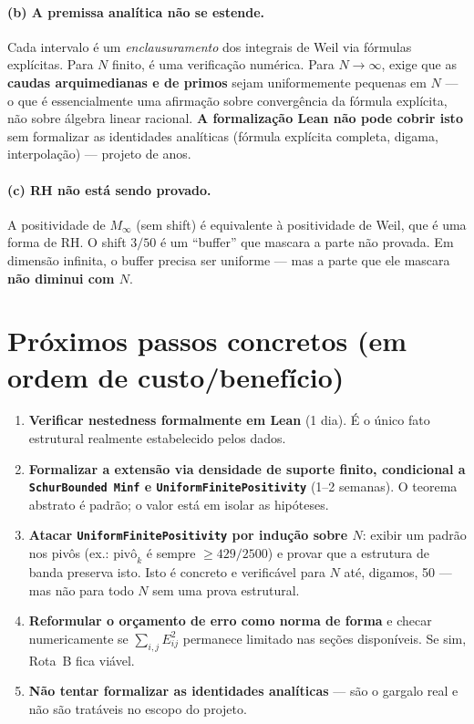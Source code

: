 \documentclass[11pt,a4paper]{article}
\theoremstyle{definition}
\theoremstyle{remark}
\begin{document}
\paragraph{(b) A premissa analítica não se estende.}
Cada intervalo é um \emph{enclausuramento} dos integrais de Weil via fórmulas
explícitas. Para \(N\) finito, é uma verificação numérica. Para
\(N\to\infty\), exige que as \textbf{caudas arquimedianas e de primos} sejam
uniformemente pequenas em \(N\) --- o que é essencialmente uma afirmação sobre
convergência da fórmula explícita, não sobre álgebra linear racional.
\textbf{A formalização Lean não pode cobrir isto} sem formalizar as identidades
analíticas (fórmula explícita completa, digama, interpolação) --- projeto de
anos.

\paragraph{(c) RH não está sendo provado.}
A positividade de \(M_\infty\) (sem shift) é equivalente à positividade de
Weil, que é uma forma de RH. O shift \(3/50\) é um ``buffer'' que mascara a
parte não provada. Em dimensão infinita, o buffer precisa ser uniforme --- mas
a parte que ele mascara \textbf{não diminui com \(N\)}.

\section{Próximos passos concretos (em ordem de custo/benefício)}

\begin{enumerate}
  \item \textbf{Verificar nestedness formalmente em Lean} (1 dia). É o único
        fato estrutural realmente estabelecido pelos dados.

  \item \textbf{Formalizar a extensão via densidade de suporte finito,
        condicional a \texttt{SchurBounded Minf} e
        \texttt{UniformFinitePositivity}} (1--2 semanas). O teorema abstrato é
        padrão; o valor está em isolar as hipóteses.

  \item \textbf{Atacar \texttt{UniformFinitePositivity} por indução sobre
        \(N\)}: exibir um padrão nos pivôs (ex.: \(\text{pivô}_k\) é sempre
        \(\ge 429/2500\)) e provar que a estrutura de banda preserva isto.
        Isto é concreto e verificável para \(N\) até, digamos, 50 --- mas não
        para todo \(N\) sem uma prova estrutural.

  \item \textbf{Reformular o orçamento de erro como norma de forma} e checar
        numericamente se \(\sum_{i,j} E_{ij}^2\) permanece limitado nas seções
        disponíveis. Se sim, Rota~B fica viável.

  \item \textbf{Não tentar formalizar as identidades analíticas} --- são o
        gargalo real e não são tratáveis no escopo do projeto.
\end{enumerate}
\end{document}
